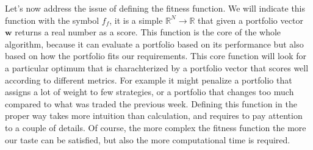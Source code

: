 Let's now address the issue of defining the fitness function. We will indicate this function with the symbol $f_f$, it is a simple $\mathbb{R}^N \rightarrow \mathbb{R}$ that given a portfolio vector $\mathbf{w}$ returns a real number as a score. This function is the core of the whole algorithm, because it can evaluate a portfolio based on its performance but also based on how the portfolio fits our requirements. This core function will look for a particular optimum that is charachterized by a portfolio vector that scores well according to different metrics. For example it might penalize a portfolio that assigns a lot of weight to few strategies, or a portfolio that changes too much compared to what was traded the previous week. Defining this function in the proper way takes more intuition than calculation, and requires to pay attention to a couple of details. Of course, the more complex the fitness function the more our taste can be satisfied, but also the more computational time is required.\\

\\
\\